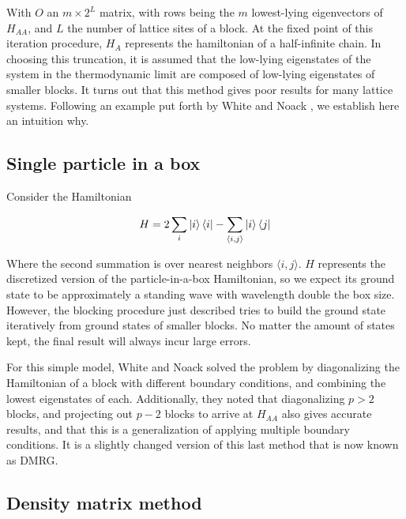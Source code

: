 With $O$ an $m \times 2^L$ matrix, with rows being the $m$ lowest-lying
eigenvectors of $H_{AA}$, and $L$ the number of lattice sites of a block. At
the fixed point of this iteration procedure, $H_A$ represents the hamiltonian
of a half-infinite chain. In choosing this truncation, it is assumed that the
low-lying eigenstates of the system in the thermodynamic limit are composed of
low-lying eigenstates of smaller blocks. It turns out that this method gives
poor results for many lattice systems. Following an example put forth by White
and Noack \cite{white1992real}, we establish here an intuition why.

\subsection{Single particle in a box}

Consider the Hamiltonian

\begin{equation} 
  H = 2 \sum_i \ket{i}\bra{i} - \sum_{\langle i, j \rangle} \ket{i}\bra{j}
\end{equation}

Where the second summation is over nearest neighbors $\langle i,
j \rangle$. $H$ represents the discretized version of the
particle-in-a-box Hamiltonian, so we expect its ground state to be
approximately a standing wave with wavelength double the box size.
However, the blocking procedure just described tries to build the ground
state iteratively from ground states of smaller blocks. No matter the
amount of states kept, the final result will always incur large errors.

For this simple model, White and Noack solved the problem by diagonalizing
the Hamiltonian of a block with different boundary conditions, and
combining the lowest eigenstates of each. Additionally, they noted that
diagonalizing $p > 2$ blocks, and projecting out $p - 2$ blocks to arrive
at $H_{AA}$ also gives accurate results, and that this is
a generalization of applying multiple boundary conditions. It is
a slightly changed version of this last method that is now known as DMRG.


\subsection{Density matrix method}















